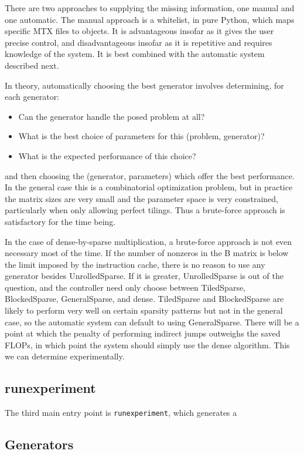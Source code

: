 There are two approaches to supplying the missing information, one manual and one automatic. The manual approach is a whitelist, in pure Python, which maps specific MTX files to  objects. It is advantageous insofar as it gives the user precise control, and disadvantageous insofar as it is repetitive and requires knowledge of the system. It is best combined with the automatic system described next.

In theory, automatically choosing the best generator involves determining, for each generator:
\begin{itemize}
  \item{Can the generator handle the posed problem at all?}
  \item{What is the best choice of parameters for this (problem, generator)?}
  \item{What is the expected performance of this choice?}
\end{itemize}
and then choosing the (generator, parameters) which offer the best performance. In the general case this is a combinatorial optimization problem, but in practice the matrix sizes are very small and the parameter space is very constrained, particularly when only allowing perfect tilings. Thus a brute-force approach is satisfactory for the time being. 

In the case of dense-by-sparse multiplication, a brute-force approach is not even necessary most of the time. If the number of nonzeros in the B matrix is below the limit imposed by the instruction cache, there is no reason to use any generator besides UnrolledSparse. If it is greater, UnrolledSparse is out of the question, and the controller need only choose between TiledSparse, BlockedSparse, GeneralSparse, and dense. TiledSparse and BlockedSparse are likely to perform very well on certain sparsity patterns but not in the general case, so the automatic system can default to using GeneralSparse. There will be a point at which the penalty of performing indirect jumps outweighs the saved FLOPs, in which point the system should simply use the dense algorithm. This we can determine experimentally.


\subsection{runexperiment}
The third main entry point is \texttt{runexperiment}, which generates a 

\subsection{Generators}

